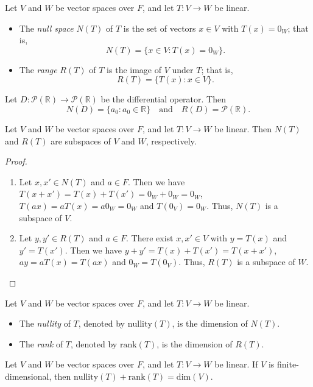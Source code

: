 \begin{definition}
  Let $V$ and $W$ be vector spaces over $F$, and let $T: V \to W$ be linear.
  \begin{itemize}
    \item The \emph{null space} $N(T)$ of $T$ is the set of vectors $x \in V$
      with $T(x) = 0_W$; that is,
      \begin{equation*}
        N(T) = \{x \in V: T(x) = 0_W\}.
      \end{equation*}
    \item The \emph{range} $R(T)$ of $T$ is the image of $V$ under $T$;
      that is,
      \begin{equation*}
        R(T) = \{T(x): x \in V\}.
      \end{equation*}
  \end{itemize}
\end{definition}
\begin{example}
  Let $D: \mathcal{P}(\mathbb{R}) \to \mathcal{P}(\mathbb{R})$ be the
  differential operator. Then
  \begin{equation*}
    N(D) = \{a_0: a_0 \in \mathbb{R}\}
    \quad \text{and}
    \quad R(D) = \mathcal{P}(\mathbb{R}).
  \end{equation*}
\end{example}

\begin{theorem}
  Let $V$ and $W$ be vector spaces over $F$, and let $T: V \to W$ be linear.
  Then $N(T)$ and $R(T)$ are subspaces of $V$ and $W$, respectively.
\end{theorem}
\begin{proof} \leavevmode
  \begin{enumerate}
    \item Let $x, x' \in N(T)$ and $a \in F$. Then we have
      $T(x + x') = T(x) + T(x') = 0_W + 0_W = 0_W$,
      $T(ax) = aT(x) = a0_W = 0_W$
      and $T(0_V) = 0_W$.
      Thus, $N(T)$ is a subspace of $V$.
    \item Let $y, y' \in R(T)$ and $a \in F$. There exist $x, x' \in V$
      with $y = T(x)$ and $y' = T(x')$. Then we have
      $y + y' = T(x) + T(x') = T(x + x')$,
      $ay = aT(x) = T(ax)$
      and $0_W = T(0_V)$.
      Thus, $R(T)$ is a subspace of $W$. \qedhere
  \end{enumerate}
\end{proof}

\begin{definition}
  Let $V$ and $W$ be vector spaces over $F$, and let $T: V \to W$ be linear.
  \begin{itemize}
    \item The \emph{nullity} of $T$, denoted by $\mathrm{nullity}(T)$,
      is the dimension of $N(T)$.
    \item The \emph{rank} of $T$, denoted by $\mathrm{rank}(T)$,
      is the dimension of $R(T)$.
  \end{itemize}
\end{definition}

\begin{theorem}
  Let $V$ and $W$ be vector spaces over $F$, and let $T: V \to W$ be linear.
  If $V$ is finite-dimensional, then
  $\mathrm{nullity}(T) + \mathrm{rank}(T) = \mathrm{dim}(V)$.
\end{theorem}